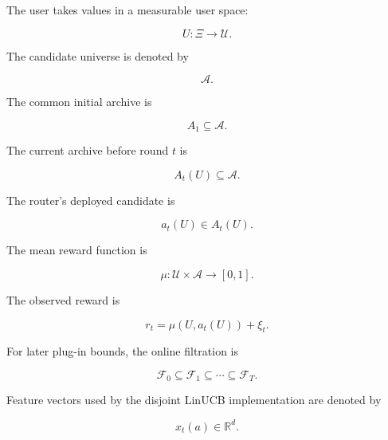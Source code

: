 \documentclass{article} %
\begin{document}
The user takes values in a measurable user space:

\begin{equation}
\label{eq:app-user-space}
U:\Xi \to \mathcal{U}.
\end{equation}

The candidate universe is denoted by

\begin{equation}
\label{eq:app-candidate-universe}
\mathcal{A}.
\end{equation}

The common initial archive is

\begin{equation}
\label{eq:app-initial-archive}
A_1 \subseteq \mathcal{A}.
\end{equation}

The current archive before round \(t\) is

\begin{equation}
\label{eq:app-current-archive}
A_t(U) \subseteq \mathcal{A}.
\end{equation}

The router's deployed candidate is

\begin{equation}
\label{eq:app-action}
a_t(U) \in A_t(U).
\end{equation}

The mean reward function is

\begin{equation}
\label{eq:app-mean-reward}
\mu:\mathcal{U}\times\mathcal{A}\to[0,1].
\end{equation}

The observed reward is

\begin{equation}
\label{eq:app-observed-reward}
r_t
=
\mu(U,a_t(U))+\xi_t.
\end{equation}

For later plug-in bounds, the online filtration is

\begin{equation}
\label{eq:app-filtration}
\mathcal{F}_0 \subseteq \mathcal{F}_1 \subseteq \cdots \subseteq \mathcal{F}_T.
\end{equation}

Feature vectors used by the disjoint LinUCB implementation are denoted by

\begin{equation}
\label{eq:app-feature-vector}
x_t(a)\in\mathbb{R}^{d}.
\end{equation}
\end{document}
